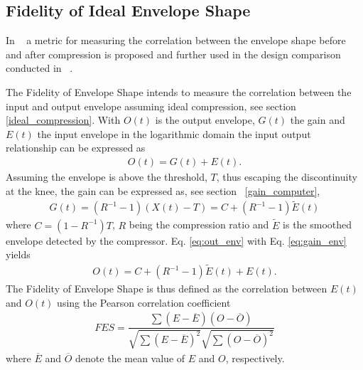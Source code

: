 \documentclass[../main2.tex]{subfiles}
\begin{document}
\subsection{Fidelity of Ideal Envelope Shape} \label{fes}
In ~\cite{stone2007quantifying} a metric for measuring the correlation between the envelope shape before and after compression is proposed and further used in the design comparison conducted in ~\cite{reiss2012tutorial}. 

The Fidelity of Envelope Shape intends to measure the correlation between the input and output envelope assuming ideal compression, see section \ref{ideal_compression}.
With $O(t)$ is the output envelope, $G(t)$ the gain and $E(t)$ the input envelope in the logarithmic domain the input output relationship can be expressed as
 \begin{align}
O(t) = G(t) + E(t).
\label{eq:out_env}
\end{align}
Assuming the envelope is above the threshold, $T$, thus escaping the discontinuity at the knee, the gain can be expressed as, see section ~\ref{gain_computer},
\begin{align}
G(t) = (R^{-1}-1)(X(t)-T) = C + (R^{-1}-1)\tilde{E}(t)
\label{eq:gain_env}
\end{align}
where $C = (1-R^{-1})T$, $R$ being the compression ratio and $\tilde{E}$ is the smoothed envelope detected by the compressor. Eq. \eqref{eq:out_env} with Eq. \eqref{eq:gain_env} yields
\begin{align}
O(t) = C + (R^{-1}-1)\tilde{E}(t) + E(t).
\end{align}
The Fidelity of Envelope Shape is thus defined as the correlation between $E(t)$ and $O(t)$ using the Pearson correlation coefficient
\begin{align}
FES = \dfrac{\sum(E-\overline{E})(O-\overline{O})}{\sqrt{\sum(E-\overline{E})^2}\sqrt{\sum(O-\overline{O})^2}}
\end{align}
where $\overline{E}$ and $\overline{O}$ denote the mean value of $E$ and $O$, respectively.
\end{document}
